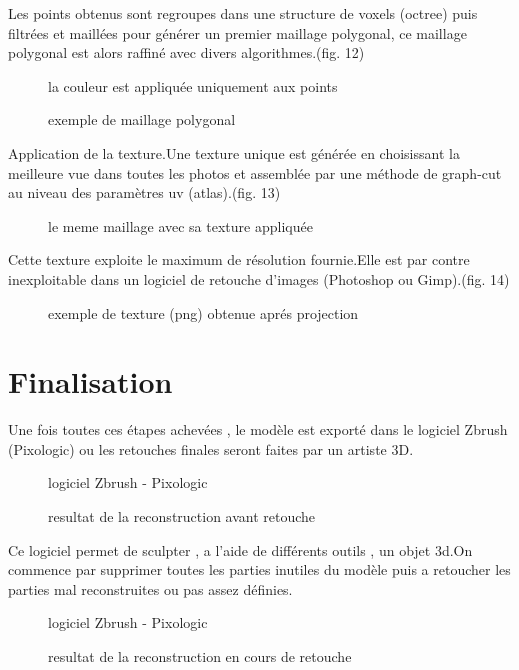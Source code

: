 \documentclass[a4paper,10pt,french]{sphinxhowto}
\begin{document}
Les points obtenus sont regroupes dans une structure de voxels (octree) puis filtrées et maillées pour générer un premier maillage polygonal,
ce maillage polygonal est alors raffiné avec divers algorithmes.(fig. 12)
\begin{figure}[htbp]
\centering
\capstart

\caption{exemple de maillage polygonal}{\small 
la couleur est appliquée uniquement aux points
}\end{figure}

Application de la texture.Une texture unique est générée en choisissant la meilleure vue dans toutes les photos et assemblée par une méthode de graph-cut au niveau des paramètres uv (atlas).(fig. 13)
\begin{figure}[htbp]
\centering
\capstart

\caption{le meme maillage avec sa texture appliquée}\end{figure}

Cette texture exploite le maximum de résolution fournie.Elle est par contre inexploitable dans un logiciel de retouche d'images (Photoshop ou Gimp).(fig. 14)
\begin{figure}[htbp]
\centering
\capstart

\caption{exemple de texture (png) obtenue aprés projection}\end{figure}


\section{Finalisation}
\label{finalisation:finalisation}\label{finalisation::doc}
Une fois toutes ces étapes achevées , le modèle est exporté dans le logiciel Zbrush (Pixologic) ou les retouches finales seront faites par un artiste 3D.
\begin{figure}[htbp]
\centering
\capstart

\caption{resultat de la reconstruction avant retouche}{\small 
logiciel Zbrush - Pixologic
}\end{figure}

Ce logiciel permet de sculpter , a l'aide de différents outils , un objet 3d.On commence par supprimer toutes les parties inutiles du modèle puis a retoucher les parties mal reconstruites ou pas assez définies.
\begin{figure}[htbp]
\centering
\capstart

\caption{resultat de la reconstruction en cours de retouche}{\small 
logiciel Zbrush - Pixologic
}\end{figure}
\end{document}
